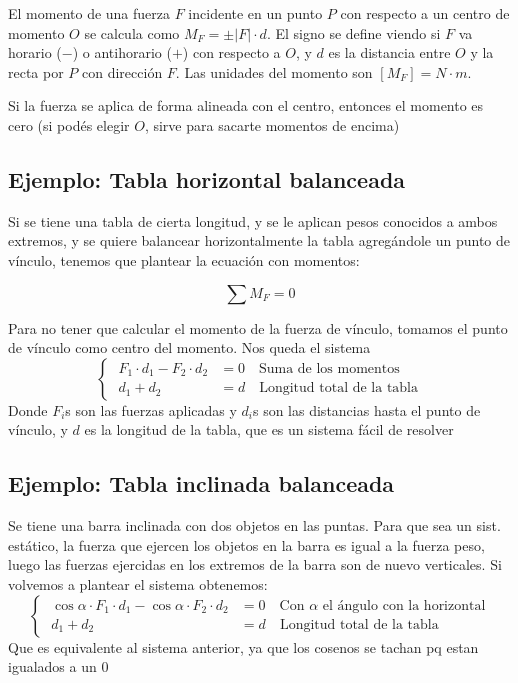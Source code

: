 \documentclass{article}
\begin{document}
El momento de una fuerza $F$ incidente en un punto $P$ con respecto a un
centro de momento $O$ se calcula como $M_F = \pm |F|\cdot d$. El signo se
define viendo si $F$ va horario ($-$) o antihorario ($+$) con respecto a
$O$, y $d$ es la distancia entre $O$ y la recta por $P$ con dirección $F$.
Las unidades del momento son $[M_F] = N\cdot m$.

Si la fuerza se aplica de forma alineada con el centro, entonces el momento
es cero (si podés elegir $O$, sirve para sacarte momentos de encima)

\subsection{Ejemplo: Tabla horizontal balanceada}
Si se tiene una tabla de cierta longitud, y se le aplican pesos conocidos a
ambos extremos, y se quiere balancear horizontalmente la tabla agregándole
un punto de vínculo, tenemos que plantear la ecuación con momentos:

\[
	\sum M_F = 0
\]

Para no tener que calcular el momento de la fuerza de vínculo, tomamos el
punto de vínculo como centro del momento. Nos queda el sistema
\[
	\begin{cases}
		\; F_1 \cdot d_1 - F_2 \cdot d_2 & = 0 \quad\text{Suma de los momentos} \\
		\; d_1 + d_2 & = d \quad\text{Longitud total de la tabla}
	\end{cases}
\]
Donde $F_i$s son las fuerzas aplicadas y $d_i$s son las distancias hasta el
punto de vínculo, y $d$ es la longitud de la tabla, que es un sistema fácil
de resolver

\subsection{Ejemplo: Tabla inclinada balanceada}
Se tiene una barra inclinada con dos objetos en las puntas. Para que sea un
sist. estático, la fuerza que ejercen los objetos en la barra es igual a la
fuerza peso, luego las fuerzas ejercidas en los extremos de la barra son de
nuevo verticales. Si volvemos a plantear el sistema obtenemos:
\[
	\begin{cases}
		\; \cos \alpha \cdot F_1 \cdot d_1 - \cos \alpha \cdot F_2 \cdot d_2 & = 0
		\quad\text{Con $\alpha$ el ángulo con la horizontal} \\
		\; d_1 + d_2 & = d \quad\text{Longitud total de la tabla}
	\end{cases}
\]
Que es equivalente al sistema anterior, ya que los cosenos se tachan pq
estan igualados a un $0$
\end{document}
